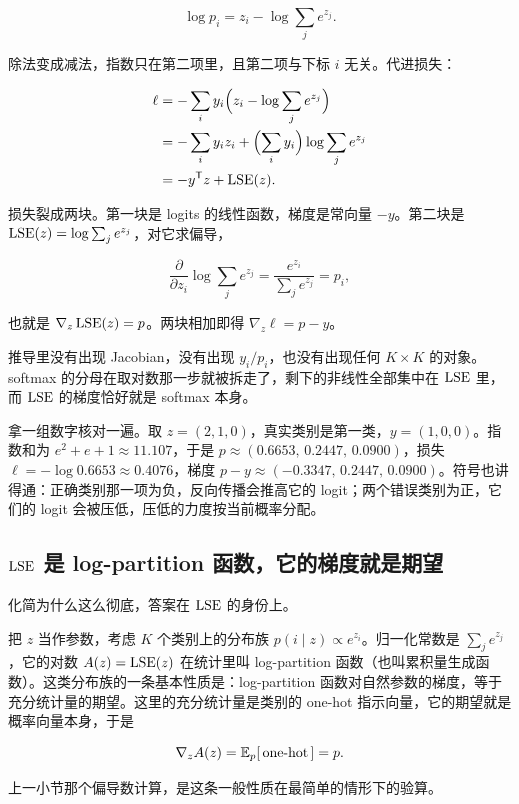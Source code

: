 \[
\log p_i=z_i-\log\sum_je^{z_j}.
\]

除法变成减法，指数只在第二项里，且第二项与下标 \(i\) 无关。代进损失：

\[
\begin{aligned}
\ell&=-\sum_iy_i\Bigl(z_i-\log\sum_je^{z_j}\Bigr)\\
&=-\sum_iy_iz_i+\Bigl(\sum_iy_i\Bigr)\log\sum_je^{z_j}\\
&=-y^{\mathsf{T}}z+\operatorname{LSE}(z).
\end{aligned}
\]

损失裂成两块。第一块是 logits 的线性函数，梯度是常向量 \(-y\)。第二块是 \(\operatorname{LSE}(z)=\log\sum_je^{z_j}\)，对它求偏导，

\[
\frac{\partial}{\partial z_i}\log\sum_je^{z_j}=\frac{e^{z_i}}{\sum_je^{z_j}}=p_i,
\]

也就是 \(\nabla_z\operatorname{LSE}(z)=p\)。两块相加即得 \(\nabla_z\ell=p-y\)。

推导里没有出现 Jacobian，没有出现 \(y_i/p_i\)，也没有出现任何 \(K\times K\) 的对象。softmax 的分母在取对数那一步就被拆走了，剩下的非线性全部集中在 \(\operatorname{LSE}\) 里，而 \(\operatorname{LSE}\) 的梯度恰好就是 softmax 本身。

拿一组数字核对一遍。取 \(z=(2,1,0)\)，真实类别是第一类，\(y=(1,0,0)\)。指数和为 \(e^2+e+1\approx11.107\)，于是 \(p\approx(0.6653,\,0.2447,\,0.0900)\)，损失 \(\ell=-\log0.6653\approx0.4076\)，梯度 \(p-y\approx(-0.3347,\,0.2447,\,0.0900)\)。符号也讲得通：正确类别那一项为负，反向传播会推高它的 logit；两个错误类别为正，它们的 logit 会被压低，压低的力度按当前概率分配。

\subsection{\texorpdfstring{\(\operatorname{LSE}\)}{LSE} 是 log-partition 函数，它的梯度就是期望}

化简为什么这么彻底，答案在 \(\operatorname{LSE}\) 的身份上。

把 \(z\) 当作参数，考虑 \(K\) 个类别上的分布族 \(p(i\mid z)\propto e^{z_i}\)。归一化常数是 \(\sum_je^{z_j}\)，它的对数 \(A(z)=\operatorname{LSE}(z)\) 在统计里叫 log-partition 函数（也叫累积量生成函数）。这类分布族的一条基本性质是：log-partition 函数对自然参数的梯度，等于充分统计量的期望。这里的充分统计量是类别的 one-hot 指示向量，它的期望就是概率向量本身，于是

\[
\nabla_zA(z)=\mathbb{E}_{p}[\,\text{one-hot}\,]=p.
\]

上一小节那个偏导数计算，是这条一般性质在最简单的情形下的验算。

